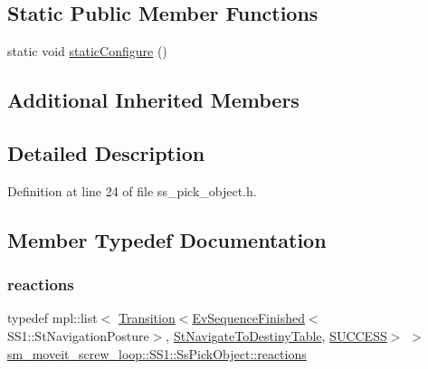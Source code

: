 \subsection*{Static Public Member Functions}
\begin{DoxyCompactItemize}
\item 
static void \hyperlink{structsm__moveit__screw__loop_1_1SS1_1_1SsPickObject_a260d65e29baa6a15237eba24ce69f8ef}{static\+Configure} ()
\end{DoxyCompactItemize}
\subsection*{Additional Inherited Members}


\subsection{Detailed Description}


Definition at line 24 of file ss\+\_\+pick\+\_\+object.\+h.



\subsection{Member Typedef Documentation}
\mbox{\label{structsm__moveit__screw__loop_1_1SS1_1_1SsPickObject_a16f7c53c06a10801a24d51dc8c48b8fd}} 
\subsubsection{\texorpdfstring{reactions}{reactions}}
{\footnotesize\ttfamily typedef mpl\+::list$<$ \hyperlink{classsmacc_1_1Transition}{Transition}$<$\hyperlink{structsmacc_1_1default__events_1_1EvSequenceFinished}{Ev\+Sequence\+Finished}$<$S\+S1\+::\+St\+Navigation\+Posture$>$, \hyperlink{structsm__moveit__screw__loop_1_1StNavigateToDestinyTable}{St\+Navigate\+To\+Destiny\+Table}, \hyperlink{structsmacc_1_1default__transition__tags_1_1SUCCESS}{S\+U\+C\+C\+E\+SS}$>$ $>$ \hyperlink{structsm__moveit__screw__loop_1_1SS1_1_1SsPickObject_a16f7c53c06a10801a24d51dc8c48b8fd}{sm\+\_\+moveit\+\_\+screw\+\_\+loop\+::\+S\+S1\+::\+Ss\+Pick\+Object\+::reactions}}



